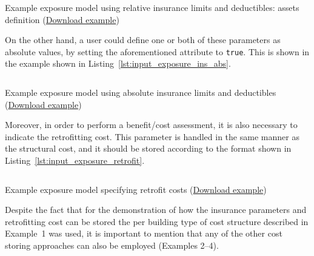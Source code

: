 \begin{listing}[htbp]
  \inputminted[firstline=22,firstnumber=22,lastline=32,fontsize=\footnotesize,frame=single,linenos,bgcolor=lightgray]{xml}{oqum/risk/verbatim/input_exposure_ins_rel.xml}
  \caption{Example exposure model using relative insurance limits and deductibles: assets definition (\href{https://raw.githubusercontent.com/GEMScienceTools/oq-engine-docs/master/oqum/risk/verbatim/input_exposure_ins_rel.xml}{Download example})}
  \label{lst:input_exposure_ins_rel_assets}
\end{listing}

On the other hand, a user could define one or both of these parameters as
absolute values, by setting the aforementioned attribute to \Verb+true+. This
is shown in the example shown in Listing~\ref{lst:input_exposure_ins_abs}.

\begin{listing}[htbp]
  \inputminted[firstline=1,firstnumber=1,fontsize=\footnotesize,frame=single,linenos,bgcolor=lightgray]{xml}{oqum/risk/verbatim/input_exposure_ins_abs.xml}
  \caption{Example exposure model using absolute insurance limits and deductibles (\href{https://raw.githubusercontent.com/GEMScienceTools/oq-engine-docs/master/oqum/risk/verbatim/input_exposure_ins_abs.xml}{Download example})}
  \label{lst:input_exposure_ins_abs}
\end{listing}

Moreover, in order to perform a benefit/cost assessment, it is also necessary
to indicate the retrofitting cost. This parameter is handled in the same
manner as the structural cost, and it should be stored according to the format
shown in Listing~\ref{lst:input_exposure_retrofit}.

\begin{listing}[htbp]
  \inputminted[firstline=1,firstnumber=1,fontsize=\footnotesize,frame=single,linenos,bgcolor=lightgray]{xml}{oqum/risk/verbatim/input_exposure_retrofit.xml}
  \caption{Example exposure model specifying retrofit costs (\href{https://raw.githubusercontent.com/GEMScienceTools/oq-engine-docs/master/oqum/risk/verbatim/input_exposure_retrofit.xml}{Download example})}
  \label{lst:input_exposure_retrofit}
\end{listing}

Despite the fact that for the demonstration of how the insurance parameters
and retrofitting cost can be stored the per building type of cost structure
described in Example~1 was used, it is important to mention that any of the
other cost storing approaches can also be employed (Examples 2--4).



